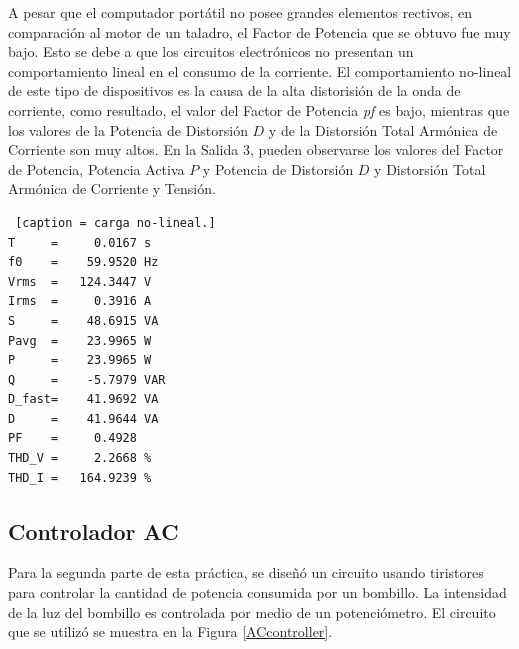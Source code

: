\documentclass[journal]{IEEEtran}
\begin{document}
A pesar que el computador portátil no posee grandes 
elementos rectivos, en comparación al motor de un taladro, 
el Factor de Potencia que se obtuvo fue muy bajo. 
Esto se debe a que los circuitos electrónicos no presentan
un comportamiento lineal en el consumo de la corriente.
El comportamiento no-lineal de este tipo de dispositivos 
es la causa de la alta distorisión de la onda de corriente, 
como resultado, el valor del Factor de Potencia \textit{pf}
es bajo, mientras que los valores de la 
Potencia de Distorsión $D$ y de
la Distorsión Total Armónica de Corriente son muy altos. 
En la Salida 3, pueden observarse los valores del Factor 
de Potencia, Potencia Activa $P$ y Potencia de 
Distorsión $D$ y Distorsión Total Armónica de Corriente 
y Tensión. 

\begin{lstlisting} [caption = carga no-lineal.]
T     =     0.0167 s 
f0    =    59.9520 Hz 
Vrms  =   124.3447 V
Irms  =     0.3916 A
S     =    48.6915 VA
Pavg  =    23.9965 W 
P     =    23.9965 W 
Q     =    -5.7979 VAR 
D_fast=    41.9692 VA 
D     =    41.9644 VA 
PF    =     0.4928 
THD_V =     2.2668 %
THD_I =   164.9239 %
\end{lstlisting}

\subsection{Controlador AC}

Para la segunda parte de esta práctica, se diseñó un 
circuito usando tiristores para controlar la cantidad 
de potencia consumida por un bombillo. La intensidad 
de la luz del bombillo es controlada por medio de un 
potenciómetro. El circuito que se utilizó se muestra 
en la Figura \ref{ACcontroller}. 

\end{document}
